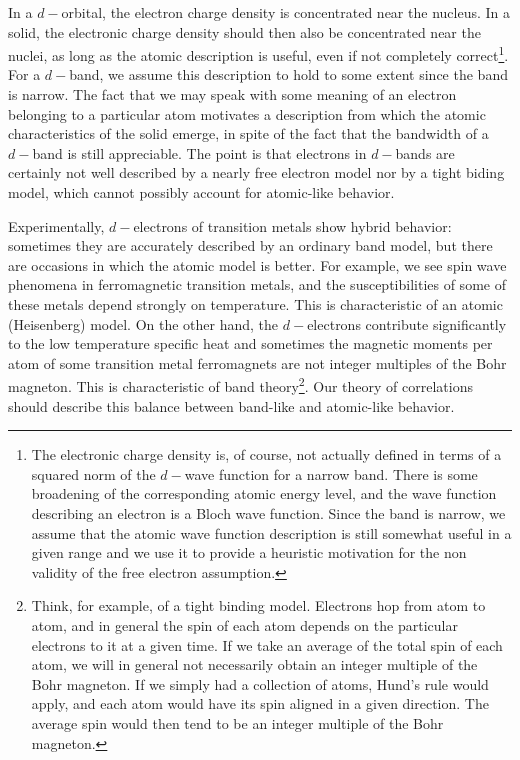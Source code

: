 In a $d-$orbital, the electron charge density is concentrated near the nucleus.
In a solid, the electronic charge density should then also be concentrated near the nuclei, as long as the atomic description is useful, even if not completely correct\footnote{The electronic charge density is, of course, not actually defined in terms of a squared norm of the $d-$wave function for a narrow band. There is some broadening of the corresponding atomic energy level, and the wave function describing an electron is a Bloch wave function. Since the band is narrow, we assume that the atomic wave function description is still somewhat useful in a given range and we use it to provide a heuristic motivation for the non validity of the free electron assumption.}.
For a $d-$band, we assume this description to hold to some extent since the band is narrow.
The fact that we may speak with some meaning of an electron belonging to a particular atom motivates a description from which the atomic characteristics of the solid emerge, in spite of the fact that the bandwidth of a $d-$band is still appreciable.
The point is that electrons in $d-$bands are certainly not well described by a nearly free electron model nor by a tight biding model, which cannot possibly account for atomic-like behavior.

Experimentally, $d-$electrons of transition metals show hybrid behavior: sometimes they are accurately described by an ordinary band model, but there are occasions in which the atomic model is better.
For example, we see spin wave phenomena in ferromagnetic transition metals, and the susceptibilities of some of these metals depend strongly on temperature.
This is characteristic of an atomic (Heisenberg) model.
On the other hand, the $d-$electrons contribute significantly to the low temperature specific heat and sometimes the magnetic moments per atom of some transition metal ferromagnets are not integer multiples of the Bohr magneton.
This is characteristic of band theory\footnote{Think, for example, of a tight binding model. Electrons hop from atom to atom, and in general the spin of each atom depends on the particular electrons  to it at a given time. If we take an average of the total spin of each atom, we will in general not necessarily obtain an integer multiple of the Bohr magneton. If we simply had a collection of atoms, Hund's rule would apply, and each atom would have its spin aligned in a given direction. The average spin would then tend to be an integer multiple of the Bohr magneton.}.
Our theory of correlations should describe this balance between band-like and atomic-like behavior.

